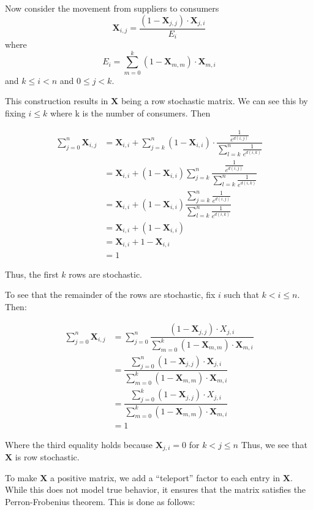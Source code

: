 \documentclass[twoside,twocolumn]{article}
\begin{document}
Now consider the movement from suppliers to consumers
$$\textbf{X}_{i, j} = \frac{(1 - \textbf{X}_{j, j})\cdot \textbf{X}_{j, i}}{E_i}$$
where 
$$E_i = \sum_{m=0}^{k} (1 - \textbf{X}_{m,m})\cdot \textbf{X}_{m, i}$$
and $k \leq i < n$ and $0 \leq j < k$.

This construction results in $\textbf{X}$ being a row stochastic matrix.
We can see this by fixing $i \leq k$ where k is the number of consumers.
Then 

\begin{align*}
\sum_{j=0}^n \textbf{X}_{i, j} &=  \textbf{X}_{i,i} + \sum_{j=k}^n (1 - \textbf{X}_{i, i}) \cdot \dfrac{\frac{1}{e^{d(i, j)}}}{\sum_{l=k}^n \frac{1}{e^{d(i, k)}}} \\
&= \textbf{X}_{i,i} + (1 - \textbf{X}_{i, i}) \sum_{j=k}^n  \dfrac{\frac{1}{e^{d(i, j)}}}{\sum_{l=k}^n \frac{1}{e^{d(i, k)}}} \\
&= \textbf{X}_{i,i} + (1 - \textbf{X}_{i, i}) \dfrac{\sum_{j=k}^n \frac{1}{e^{d(i, j)}}}{\sum_{l=k}^n \frac{1}{e^{d(i, k)}}} \\
&= \textbf{X}_{i,i} + (1 - \textbf{X}_{i, i}) \\
&= \textbf{X}_{i,i} + 1 - \textbf{X}_{i, i} \\
&= 1
\end{align*}

Thus, the first $k$ rows are stochastic.

To see that the remainder of the rows are stochastic, fix $i$ such that $ k < i \leq n$.  Then:

\begin{align*}
\sum_{j=0}^n \textbf{X}_{i, j} &= \sum_{j=0}^n \dfrac{(1-\textbf{X}_{j, j}) \cdot X_{j,i}}{\sum_{m=0}^k (1-\textbf{X}_{m, m}) \cdot \textbf{X}_{m, i}} \\
&= \dfrac{ \sum_{j=0}^n (1-\textbf{X}_{j, j}) \cdot \textbf{X}_{j,i}}{\sum_{m=0}^k (1-\textbf{X}_{m, m}) \cdot \textbf{X}_{m, i}} \\
&= \dfrac{ \sum_{j=0}^k (1-\textbf{X}_{j, j}) \cdot X_{j,i}}{\sum_{m=0}^k (1-\textbf{X}_{m, m}) \cdot \textbf{X}_{m, i}} \\
&= 1
\end{align*}

Where the third equality holds because $\textbf{X}_{j, i} = 0$ for $ k < j \leq n$
Thus, we see that $\textbf{X}$ is row stochastic.

To make $\textbf{X}$ a positive matrix, we add a ``teleport'' factor to each entry in $\textbf{X}$.
While this does not model true behavior, it ensures that the matrix satisfies the Perron-Frobenius theorem.
This is done as follows:
\end{document}
